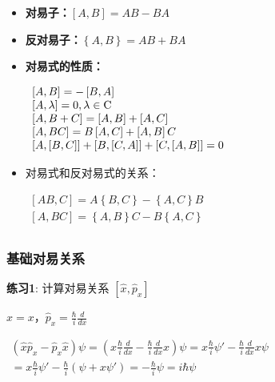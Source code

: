 \begin{itemize}
    \item \textbf{对易子：}$\left[ {A,B} \right] = AB - BA$

    \item \textbf{反对易子：}$\left\{ {A,B} \right\} = AB + BA$

    \item \textbf{对易式的性质：}

   $\begin{array}{l}
 \left[ {A,B} \right] =  - \left[ {B,A} \right] \\
 \left[ {A,\lambda } \right] = 0,\lambda  \in {\rm{C}} \\
 \left[ {A,B + C} \right] = \left[ {A,B} \right] + \left[ {A,C} \right] \\
 \left[ {A,BC} \right] = B\left[ {A,C} \right] + \left[ {A,B} \right]C \\
 \left[ {A,\left[ {B,C} \right]} \right] + \left[ {B,\left[ {C,A} \right]} \right] + \left[ {C,\left[ {A,B} \right]} \right] = 0 \\
 \end{array}$

    \item 对易式和反对易式的关系：

$\begin{array}{l}
 \left[ {AB,C} \right] = A\left\{ {B,C} \right\} - \left\{ {A,C} \right\}B \\
 \left[ {A,BC} \right] = \left\{ {A,B} \right\}C - B\left\{ {A,C} \right\} \\
 \end{array}$

\end{itemize}


\subsubsection{基础对易关系}

\textbf{练习1}: 计算对易关系 $\left[ {\hat x , \hat p_x } \right]$

$\hat x = x$，$\hat p_x  = \frac{\hbar }{i}\frac{d}{{dx}}$

$\begin{array}{l}
 \left( {\hat x \hat p_x  - \hat p_x \hat x} \right)\psi  = \left( {x\frac{\hbar }{i}\frac{d}{{dx}} - \frac{\hbar }{i}\frac{d}{{dx}}x} \right)\psi  = x\frac{\hbar }{i}\psi ' - \frac{\hbar }{i}\frac{d}{{dx}}x\psi  \\
  = x\frac{\hbar }{i}\psi ' - \frac{\hbar }{i}\left( {\psi  + x\psi '} \right) =  - \frac{\hbar }{i}\psi  = i\hbar \psi  \\
 \end{array}$

